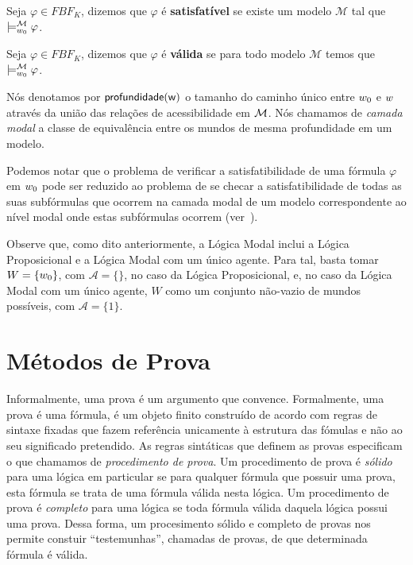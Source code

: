 \begin{definition}
    Seja $\varphi \in FBF_{K}$, dizemos que $\varphi$ é
    \textbf{satisfatível} se existe um modelo $\mathcal{M}$ tal que $\models ^{\mathcal{M}}_{w_0} \varphi$.  
\end{definition}

\begin{definition}
    Seja $\varphi \in FBF_{K}$, dizemos que $\varphi$ é
    \textbf{válida} se para todo modelo $\mathcal{M}$ temos que $\models ^{\mathcal{M}}_{w_0} \varphi$.  
\end{definition}

Nós denotamos por $\sf profundidade(w)$ o tamanho do caminho único entre $w_0$ e  $w$
através da união das relações de acessibilidade em ${\cal M}$. 
Nós chamamos de \emph{camada modal} a classe de equivalência entre os mundos de
mesma profundidade em um modelo.

Podemos notar que o problema de verificar a satisfatibilidade de uma fórmula
$\varphi$ em $w_0$ pode ser reduzido ao problema de se checar a
satisfatibilidade de todas as suas subfórmulas que ocorrem na camada modal de um
modelo correspondente ao nível modal onde estas subfórmulas ocorrem
(ver~\cite{Areces00tree-basedheuristics}). 

Observe que, como dito anteriormente, a Lógica Modal  inclui a
Lógica Proposicional e a Lógica Modal com um único agente. Para tal, basta tomar
$W = \{w_0\}$, com $\mathcal{A} = \{\}$, no caso da Lógica Proposicional, e,
no caso da Lógica Modal com um único agente, $W$ como um conjunto não-vazio de
mundos possíveis, com $\mathcal{A} = \{1\}$.

\section{Métodos de Prova}
\label{sec:metodos}
Informalmente, uma prova é um argumento que convence. Formalmente, uma prova é
uma fórmula, é um objeto finito construído de acordo com regras de sintaxe
fixadas que fazem referência unicamente à estrutura das fómulas e não ao seu
significado pretendido. As regras sintáticas que definem as provas especificam o
que chamamos de \textit{procedimento de prova}.
Um procedimento de prova é \textit{sólido} para uma lógica em particular se
para qualquer fórmula que possuir uma prova, esta fórmula se trata de uma
fórmula válida nesta lógica. Um procedimento de prova é \textit{completo} para
uma lógica se toda fórmula válida daquela lógica possui uma prova. Dessa forma,
um procesimento sólido e completo de provas nos permite constuir
``testemunhas'', chamadas de provas, de que determinada fórmula é válida.


